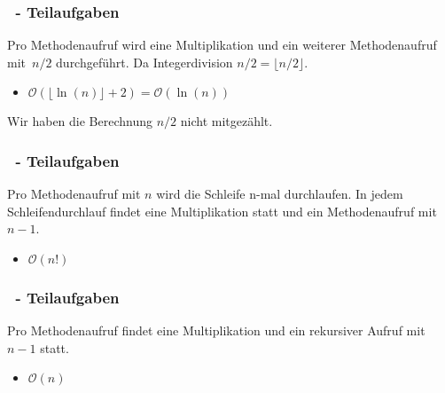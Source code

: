 \begin{frame}%
  \frametitle{\stitle\ - Teilaufgaben}%

\pause
Pro Methodenaufruf wird eine Multiplikation und ein weiterer Methodenaufruf mit~$n/2$ durchgeführt.
Da Integerdivision $n/2 = \lfloor n/2 \rfloor$.
\begin{itemize}
    \item $\mathcal{O}( \lfloor \ln(n) \rfloor+2)= \mathcal{O}(\ln(n))$
\end{itemize}
Wir haben die Berechnung $n/2$ nicht mitgezählt.
\end{frame}

\begin{frame}%
  \frametitle{\stitle\ - Teilaufgaben}%

\pause
Pro Methodenaufruf mit $n$ wird die Schleife n-mal durchlaufen.
In jedem Schleifendurchlauf findet eine Multiplikation statt und ein Methodenaufruf mit~$n-1$.
\begin{itemize}
    \item $\mathcal{O}(n!)$
\end{itemize}
\end{frame}

\begin{frame}%
  \frametitle{\stitle\ - Teilaufgaben}%

\pause
Pro Methodenaufruf findet eine Multiplikation und ein rekursiver Aufruf mit $n-1$ statt.
\begin{itemize}
    \item $\mathcal{O}(n)$
\end{itemize}
\end{frame}
